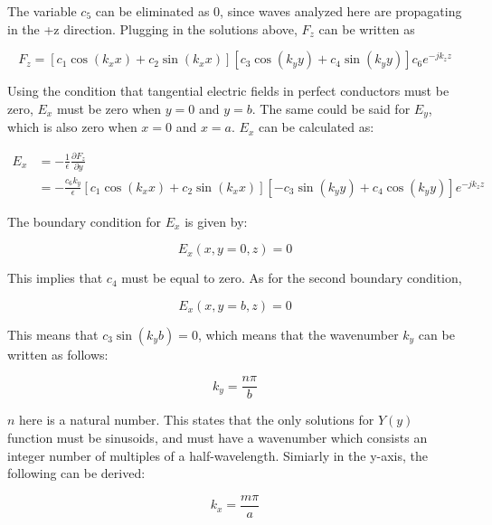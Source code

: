 \documentclass[a4paper,12pt]{report}
\begin{document}
The variable $c_5$ can be eliminated as $0$,
since waves analyzed here are propagating in the +z direction.
Plugging in the solutions above, $F_z$ can be written as

\begin{equation}
  F_z = [c_1 \cos (k_x x) + c_2 \sin (k_x x)][c_3 \cos (k_y y) + c_4 \sin (k_y y)]c_6 e^{-j k_z z}
\end{equation}

Using the condition that tangential electric fields in perfect conductors must be zero,
$E_x$ must be zero when $y=0$ and $y=b$.
The same could be said for $E_y$,
which is also zero when $x=0$ and $x=a$.
$E_x$ can be calculated as:

\begin{equation}
  \begin{split}
    E_x &= -\frac{1}{\epsilon} \frac{\partial F_z}{\partial y} \\
        &= - \frac{c_6 k_y}{\epsilon}[c_1 \cos (k_x x) + c_2 \sin (k_x x)][-c_3 \sin (k_y y) + c_4 \cos(k_y y)]e^{-jk_z z}
  \end{split}
\end{equation}

The boundary condition for $E_x$ is given by:

\begin{equation}
  E_x(x, y=0, z) = 0
\end{equation}

This implies that $c_4$ must be equal to zero.
As for the second boundary condition,

\begin{equation}
  E_x(x, y=b, z) = 0
\end{equation}

This means that $c_3 \sin (k_y b) = 0$, which means that the wavenumber $k_y$
can be written as follows:

\begin{equation} \label{eq:wavenumber_y}
  k_y = \frac{n\pi}{b}
\end{equation}

$n$ here is a natural number.
This states that the only solutions for $Y(y)$ function must be sinusoids,
and must have a wavenumber
which consists an integer number of multiples of a half-wavelength.
Simiarly in the y-axis, the following can be derived:

\begin{equation} \label{eq:wavenumber_x}
  k_x = \frac{m\pi}{a}
\end{equation}
\end{document}
